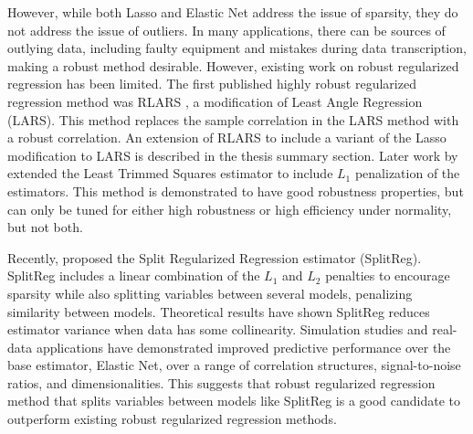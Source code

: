 However, while both Lasso and Elastic Net address the issue of sparsity, they do not address the issue of outliers. In many applications, there can be sources of outlying data, including faulty equipment and mistakes during data transcription, making a robust method desirable. However, existing work on robust regularized regression has been limited. The first published highly robust regularized regression method was RLARS \cite{khan2007}, a modification of Least Angle Regression (LARS). This method replaces the sample correlation in the LARS method with a robust correlation. An extension of RLARS to include a variant of the Lasso modification to LARS is described in the thesis summary section. Later work by \cite{alfons2013} extended the Least Trimmed Squares estimator \cite{roussLTS} to include $L_1$ penalization of the estimators. This method is demonstrated to have good robustness properties, but can only be tuned for either high robustness or high efficiency under normality, but not both.

Recently, \cite{christidis2019split} proposed the Split Regularized Regression estimator (SplitReg). SplitReg includes a linear combination of the $L_1$ and $L_2$ penalties to encourage sparsity while also splitting variables between several models, penalizing similarity between models. Theoretical results \cite{christidis2018split} have shown SplitReg reduces estimator variance when data has some collinearity. Simulation studies and real-data applications have demonstrated improved predictive performance over the base estimator, Elastic Net, over a range of correlation structures, signal-to-noise ratios, and dimensionalities. This suggests that robust regularized regression method that splits variables between models like SplitReg is a good candidate to outperform existing robust regularized regression methods.

